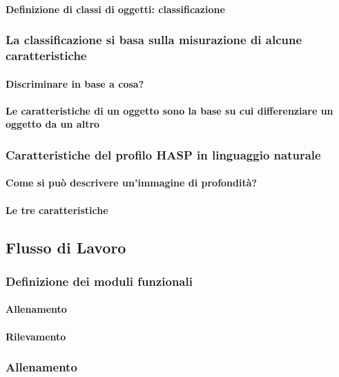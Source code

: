                 \paragraph{Definizione di classi di oggetti: classificazione}
            \subsubsection{La classificazione si basa sulla misurazione di alcune caratteristiche}
                \paragraph{Discriminare in base a cosa?}
                \paragraph{Le caratteristiche di un oggetto sono la base su cui differenziare un oggetto da un altro}
            \subsubsection{Caratteristiche del profilo HASP in linguaggio naturale}
                \paragraph{Come si può descrivere un'immagine di profondità?}
                \paragraph{Le tre caratteristiche}
        \subsection{Flusso di Lavoro}
        \label{sub:overall_workflow}
            \subsubsection{Definizione dei moduli funzionali}
                \paragraph{Allenamento}
                \paragraph{Rilevamento}
            \subsubsection{Allenamento}

